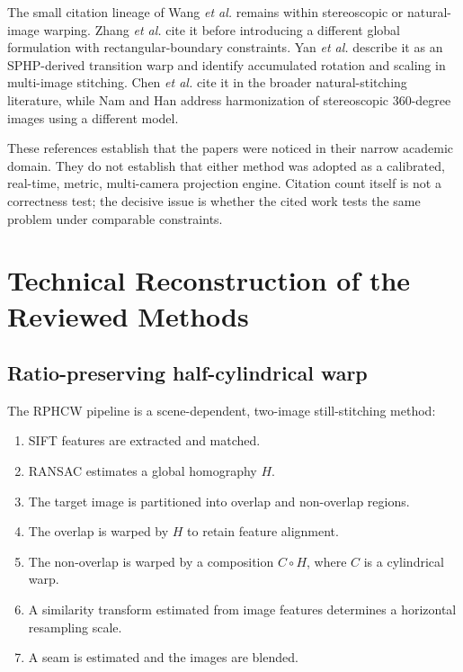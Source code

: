 \documentclass[10pt]{article}
\newcommand{\RPHCW}{RPHCW}
\begin{document}
The small citation lineage of Wang \emph{et al.} remains within stereoscopic or natural-image warping. Zhang \emph{et al.} \cite{zhang2019} cite it before introducing a different global formulation with rectangular-boundary constraints. Yan \emph{et al.} \cite{yan2020} describe it as an SPHP-derived transition warp and identify accumulated rotation and scaling in multi-image stitching. Chen \emph{et al.} \cite{chen2020} cite it in the broader natural-stitching literature, while Nam and Han \cite{nam2021} address harmonization of stereoscopic 360-degree images using a different model.

These references establish that the papers were noticed in their narrow academic domain. They do not establish that either method was adopted as a calibrated, real-time, metric, multi-camera projection engine. Citation count itself is not a correctness test; the decisive issue is whether the cited work tests the same problem under comparable constraints.

\section{Technical Reconstruction of the Reviewed Methods}

\subsection{Ratio-preserving half-cylindrical warp}

The \RPHCW{} pipeline \cite{xu2018} is a scene-dependent, two-image still-stitching method:

\begin{enumerate}
  \item SIFT features are extracted and matched.
  \item RANSAC estimates a global homography $H$.
  \item The target image is partitioned into overlap and non-overlap regions.
  \item The overlap is warped by $H$ to retain feature alignment.
  \item The non-overlap is warped by a composition $C\circ H$, where $C$ is a cylindrical warp.
  \item A similarity transform estimated from image features determines a horizontal resampling scale.
  \item A seam is estimated and the images are blended.
\end{enumerate}
\end{document}
